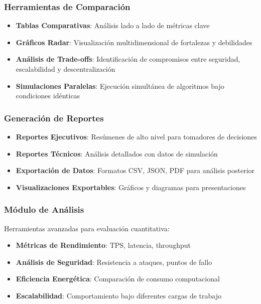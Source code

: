 \documentclass[spanish,12pt,letterpaper]{report}
\begin{document}
\subsubsection{Herramientas de Comparación}
\begin{itemize}
    \item \textbf{Tablas Comparativas}: Análisis lado a lado de métricas clave
    \item \textbf{Gráficos Radar}: Visualización multidimensional de fortalezas y debilidades
    \item \textbf{Análisis de Trade-offs}: Identificación de compromisos entre seguridad, escalabilidad y descentralización
    \item \textbf{Simulaciones Paralelas}: Ejecución simultánea de algoritmos bajo condiciones idénticas
\end{itemize}

\subsubsection{Generación de Reportes}
\begin{itemize}
    \item \textbf{Reportes Ejecutivos}: Resúmenes de alto nivel para tomadores de decisiones
    \item \textbf{Reportes Técnicos}: Análisis detallados con datos de simulación
    \item \textbf{Exportación de Datos}: Formatos CSV, JSON, PDF para análisis posterior
    \item \textbf{Visualizaciones Exportables}: Gráficos y diagramas para presentaciones
\end{itemize}

\subsubsection{Módulo de Análisis}

Herramientas avanzadas para evaluación cuantitativa:

\begin{itemize}
    \item \textbf{Métricas de Rendimiento}: TPS, latencia, throughput
    \item \textbf{Análisis de Seguridad}: Resistencia a ataques, puntos de fallo
    \item \textbf{Eficiencia Energética}: Comparación de consumo computacional
    \item \textbf{Escalabilidad}: Comportamiento bajo diferentes cargas de trabajo
\end{itemize}
\end{document}
